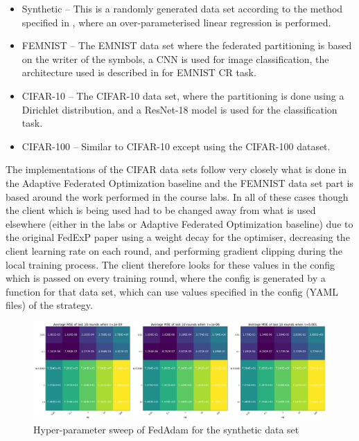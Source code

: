 \documentclass{article}
\begin{document}
\begin{itemize}
    \item Synthetic -- This is a randomly generated data set according to the method specified in \cite{syntheticDatasetGeneration}, where an over-parameterised linear regression is performed.
    \item FEMNIST -- The EMNIST data set where the federated partitioning is based on the writer of the symbols, a CNN is used for image classification, the architecture used is described in \cite{AdaptiveFederatedOptimisation} for EMNIST CR task.
    \item CIFAR-10 -- The CIFAR-10 data set, where the partitioning is done using a Dirichlet distribution, and a ResNet-18 model \cite{ResNet} is used for the classification task.
    \item CIFAR-100 -- Similar to CIFAR-10 except using the CIFAR-100 dataset.
\end{itemize}

The implementations of the CIFAR data sets follow very closely what is done in the Adaptive Federated Optimization baseline and the FEMNIST data set part is based around the work performed in the course labs.  In all of these cases though the client which is being used had to be changed away from what is used elsewhere (either in the labs or Adaptive Federated Optimization baseline) due to the original FedExP paper \cite{FedExP} using a weight decay for the optimiser, decreasing the client learning rate on each round, and performing gradient clipping during the local training process.  The client therefore looks for these values in the config which is passed on every training round, where the config is generated by a function for that data set, which can use values specified in the config (YAML files) of the strategy.

\begin{figure}
    \centerline{\includegraphics[width=\linewidth]{figs/fedAdamSyntheticHyperpameterTuning.pdf}}
    \caption{Hyper-parameter sweep of FedAdam for the synthetic data set}
    \label{fig:fedAdamSweep}
\end{figure}
\end{document}
